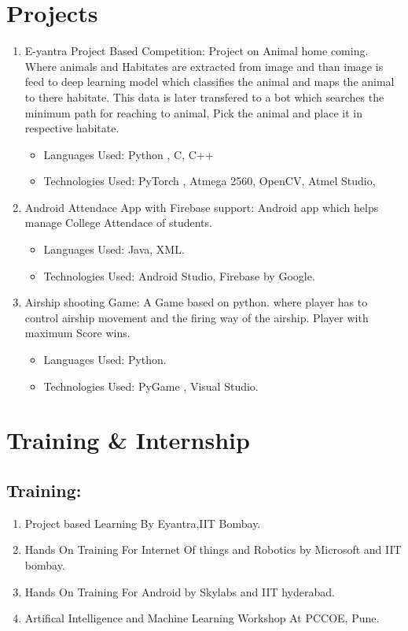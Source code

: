 \documentclass[10pt]{article}
\begin{document}
\section{Projects}
	\begin{enumerate}
		\item E-yantra Project Based Competition: Project on Animal home coming. Where animals and Habitates are extracted from image and than image is feed to deep learning model which classifies the animal and maps the animal to there habitate. This data is later transfered to a bot which searches the minimum path for reaching to animal, Pick the animal and place it in respective habitate.
			\begin{itemize}
			\item Languages Used: Python , C, C++
			\item Technologies Used: PyTorch , Atmega 2560, OpenCV, Atmel Studio, 
			
			\end{itemize}
		\item Android Attendace App with Firebase support: Android app which helps manage College Attendace of students.
			\begin{itemize}
			\item Languages Used: Java, XML.
			\item Technologies Used: Android Studio, Firebase by Google. 
			
			\end{itemize}
		\item Airship shooting Game:  A Game based on python.  where player has to control airship movement and the firing way of the airship. Player with maximum Score wins.
			\begin{itemize}
			\item Languages Used: Python.
			\item Technologies Used: PyGame , Visual Studio. 
			
			\end{itemize}
  
	\end{enumerate}


\section{Training \& Internship}
\subsection{Training:}
\begin{enumerate}
\item Project based Learning By Eyantra,IIT Bombay.
\item Hands On Training For Internet Of things and Robotics by Microsoft and IIT bombay.
\item Hands On Training For Android by Skylabs and IIT hyderabad.
\item Artifical Intelligence and Machine Learning Workshop At PCCOE, Pune. 
\end{enumerate}
\end{document}

